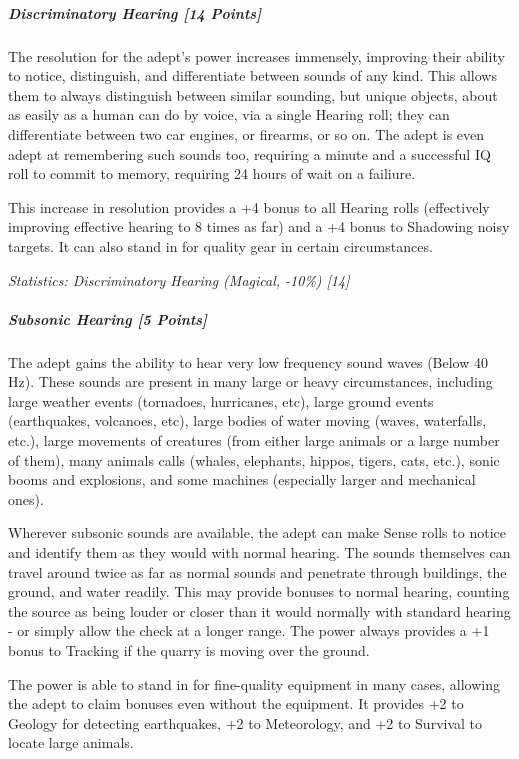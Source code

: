 \begin{multicols}{3}
	\subparagraph{Discriminatory Hearing [14 Points]}
	
		The resolution for the adept's power increases immensely, improving their ability to notice, distinguish, and differentiate between sounds of any kind. This allows them to always distinguish between similar sounding, but unique objects, about as easily as a human can do by voice, via a single Hearing roll; they can differentiate between two car engines, or firearms, or so on. The adept is even adept at remembering such sounds too, requiring a minute and a successful IQ roll to commit to memory, requiring 24 hours of wait on a failiure.
		
		This increase in resolution provides a +4 bonus to all Hearing rolls (effectively improving effective hearing to 8 times as far) and a +4 bonus to Shadowing noisy targets. It can also stand in for quality gear in certain circumstances.
	
		\textcolor{OliveGreen}{\textit{Statistics: Discriminatory Hearing (Magical, -10\%) [14] }}
	
	\subparagraph{Subsonic Hearing [5 Points]}
	
		The adept gains the ability to hear very low frequency sound waves (Below 40 Hz). These sounds are present in many large or heavy circumstances, including large weather events (tornadoes, hurricanes, etc), large ground events (earthquakes, volcanoes, etc), large bodies of water moving (waves, waterfalls, etc.), large movements of creatures (from either large animals or a large number of them), many animals calls (whales, elephants, hippos, tigers, cats, etc.), sonic booms and explosions, and some machines (especially larger and mechanical ones). 
		
		Wherever subsonic sounds are available, the adept can make Sense rolls to notice and identify them as they would with normal hearing. The sounds themselves can travel around twice as far as normal sounds and penetrate through buildings, the ground, and water readily. This may provide bonuses to normal hearing, counting the source as being louder or closer than it would normally with standard hearing - or simply allow the check at a longer range. The power always provides a +1 bonus to Tracking if the quarry is moving over the ground. 
		
		The power is able to stand in for fine-quality equipment in many cases, allowing the adept to claim bonuses even without the equipment. It provides +2 to Geology for detecting earthquakes, +2 to Meteorology, and +2 to Survival to locate large animals.
	

\end{multicols}
